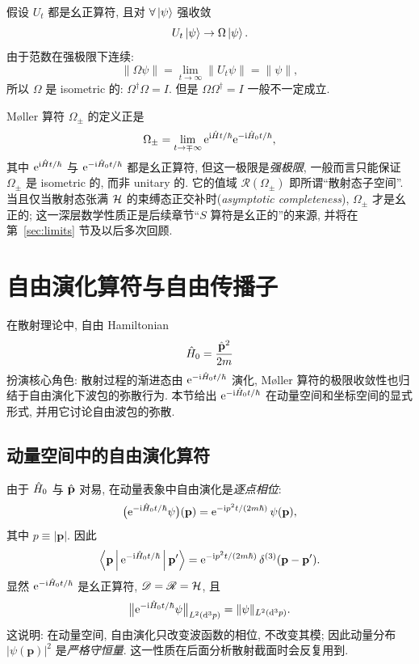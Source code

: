 假设 $U_t$ 都是幺正算符, 且对 $\forall \ket\psi$ 强收敛
\begin{equation}
U_t\ket\psi\to \Omega\ket\psi.
\end{equation}
由于范数在强极限下连续:
\begin{equation}
\|\Omega\psi\|=\lim_{t\to\infty}\|U_t\psi\|=\|\psi\|,
\end{equation}
所以 $\Omega$ 是 isometric 的: $\Omega^{\dagger}\Omega=I$. 但是 $\Omega\Omega^{\dagger}=I$ 一般不一定成立.

\begin{remark}[物理意义]
M\o ller 算符 $\Omega_{\pm}$ 的定义正是
\[\Omega_{\pm}=\lim_{t\to\mp\infty}\mathrm{e}^{\mathrm{i}\hat{H} t/\hbar}\mathrm{e}^{-\mathrm{i}\hat{H}_0 t/\hbar},\]
其中 $\mathrm{e}^{\mathrm{i}\hat{H} t/\hbar}$ 与 $\mathrm{e}^{-\mathrm{i}\hat{H}_0 t/\hbar}$ 都是幺正算符, 但这一极限是\emph{强极限}, 一般而言只能保证 $\Omega_\pm$ 是 isometric 的, 而非 unitary 的. 它的值域 $\mathscr R(\Omega_\pm)$ 即所谓``散射态子空间''. 当且仅当散射态张满 $\mathcal{H}$ 的束缚态正交补时(\emph{asymptotic completeness}), $\Omega_\pm$ 才是幺正的; 这一深层数学性质正是后续章节``$S$ 算符是幺正的''的来源, 并将在第~\ref{sec:limits} 节及以后多次回顾.
\end{remark}

\section{自由演化算符与自由传播子}\label{sec:qm-free-propagator}

在散射理论中, 自由 Hamiltonian
\begin{equation}\label{eq:qm-H0-def}
\hat{H}_0=\frac{\hat{\mathbf p}^{2}}{2m}
\end{equation}
扮演核心角色: 散射过程的渐进态由 $\mathrm{e}^{-\mathrm{i}\hat{H}_0 t/\hbar}$ 演化, M\o{}ller 算符的极限收敛性也归结于自由演化下波包的弥散行为. 本节给出 $\mathrm{e}^{-\mathrm{i}\hat{H}_0 t/\hbar}$ 在动量空间和坐标空间的显式形式, 并用它讨论自由波包的弥散.

\subsection{动量空间中的自由演化算符}

由于 $\hat{H}_0$ 与 $\hat{\mathbf p}$ 对易, 在动量表象中自由演化是\emph{逐点相位}:
\begin{equation}\label{eq:qm-U0-momentum}
\bigl(\mathrm{e}^{-\mathrm{i}\hat{H}_0 t/\hbar}\psi\bigr)(\mathbf p)
=\mathrm{e}^{-\mathrm{i} p^{2} t/(2m\hbar)}\,\psi(\mathbf p),
\end{equation}
其中 $p\equiv|\mathbf p|$. 因此
\begin{equation}\label{eq:qm-p-matel}
\left\langle \mathbf p \,\middle|\, \mathrm{e}^{-\mathrm{i}\hat{H}_0 t/\hbar} \,\middle|\, \mathbf p' \right\rangle
=\mathrm{e}^{-\mathrm{i} p^{2} t/(2m\hbar)}\,\delta^{(3)}(\mathbf p-\mathbf p').
\end{equation}
显然 $\mathrm{e}^{-\mathrm{i}\hat{H}_0 t/\hbar}$ 是幺正算符, $\mathscr D=\mathscr R=\mathcal{H}$, 且
\begin{equation}
\bigl\|\mathrm{e}^{-\mathrm{i}\hat{H}_0 t/\hbar}\psi\bigr\|_{L^{2}(\mathrm{d}^{3}p)}
=\|\psi\|_{L^{2}(\mathrm{d}^{3}p)}.
\end{equation}
这说明: 在动量空间, 自由演化只改变波函数的相位, 不改变其模; 因此动量分布 $|\psi(\mathbf p)|^{2}$ 是\emph{严格守恒量}. 这一性质在后面分析散射截面时会反复用到.

